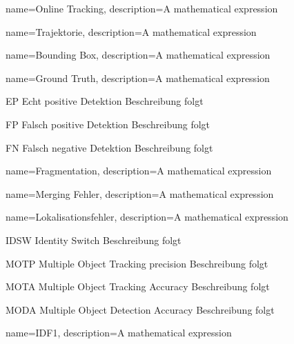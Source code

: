 {
        name=Online Tracking,
        description={A mathematical expression}
}

{
        name=Trajektorie,
        description={A mathematical expression}
}

{
        name=Bounding Box,
        description={A mathematical expression}
}

{
        name=Ground Truth,
        description={A mathematical expression}
}



\newglossaryentrywithacronym
{EP}
{Echt positive Detektion}
{Beschreibung folgt}

\newglossaryentrywithacronym
{FP}
{Falsch positive Detektion}
{Beschreibung folgt}

\newglossaryentrywithacronym
{FN}
{Falsch negative Detektion}
{Beschreibung folgt}

{
        name=Fragmentation,
        description={A mathematical expression}
}

{
        name=Merging Fehler,
        description={A mathematical expression}
}

{
        name=Lokalisationsfehler,
        description={A mathematical expression}
}

\newglossaryentrywithacronym
{IDSW}
{Identity Switch}
{Beschreibung folgt}


\newglossaryentrywithacronym
{MOTP}
{Multiple Object Tracking precision}
{Beschreibung folgt}

\newglossaryentrywithacronym
{MOTA}
{Multiple Object Tracking Accuracy}
{Beschreibung folgt}

\newglossaryentrywithacronym
{MODA}
{Multiple Object Detection Accuracy}
{Beschreibung folgt}

{
        name=IDF1,
        description={A mathematical expression}
}

